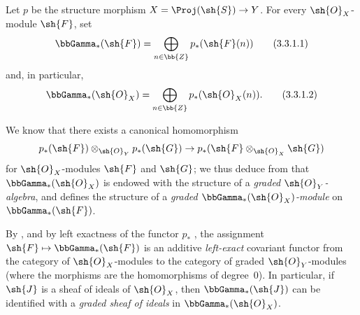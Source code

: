 \begin{env}[3.3.1]
\label{II.3.3.1}
Let $p$ be the structure morphism $X=\Proj(\sh{S})\to Y$.
For every $\sh{O}_X$-module $\sh{F}$, set
\[
\label{II.3.3.1.1}
  \bbGamma_*(\sh{F}) = \bigoplus_{n\in\bb{Z}}p_*(\sh{F}(n))
  \tag{3.3.1.1}
\]
and, in particular,
\[
\label{II.3.3.1.2}
  \bbGamma_*(\sh{O}_X) = \bigoplus_{n\in\bb{Z}}p_*(\sh{O}_X(n)).
\tag{3.3.1.2}
\]

We know  that there exists a canonical homomorphism
\[
  p_*(\sh{F})\otimes_{\sh{O}_Y}p_*(\sh{G}) \to p_*(\sh{F}\otimes_{\sh{O}_X}\sh{G})
\]
for $\sh{O}_X$-modules $\sh{F}$ and $\sh{G}$;
we thus deduce from  that $\bbGamma_*(\sh{O}_X)$ is endowed with the structure of a \emph{graded $\sh{O}_Y$-algebra}, and  defines the structure of a \emph{graded $\bbGamma_*(\sh{O}_X)$-module} on $\bbGamma_*(\sh{F})$.

By , and by left exactness of the functor $p_*$ , the assignment $\sh{F}\mapsto\bbGamma_*(\sh{F})$ is an additive \emph{left-exact} covariant functor from the category of $\sh{O}_X$-modules to the category of graded $\sh{O}_Y$-modules (where the morphisms are the homomorphisms of degree~$0$).
In particular, if $\sh{J}$ is a sheaf of ideals of $\sh{O}_X$, then $\bbGamma_*(\sh{J})$ can be identified with a \emph{graded sheaf of ideals} in $\bbGamma_*(\sh{O}_X)$.
\end{env}


